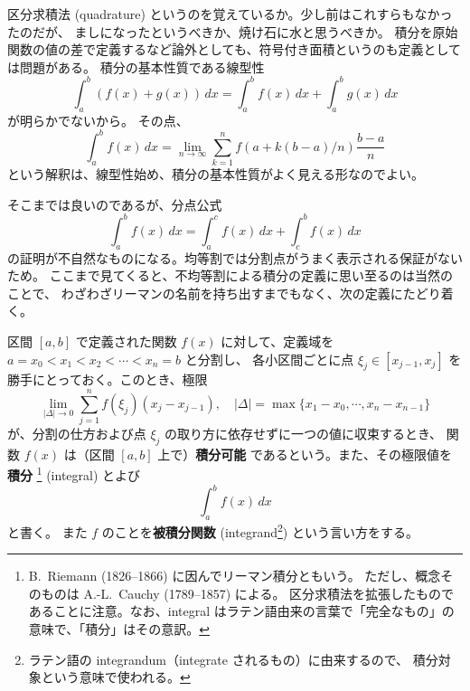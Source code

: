 \documentclass[a4paper]{jsarticle}
\theoremstyle{definition}
\theoremstyle{remark}
\begin{document}
区分求積法 (quadrature) というのを覚えているか。少し前はこれすらもなかったのだが、
ましになったというべきか、焼け石に水と思うべきか。
積分を原始関数の値の差で定義するなど論外としても、符号付き面積というのも定義としては問題がある。
積分の基本性質である線型性
\[
\int_a^b (f(x) + g(x))\, dx = \int_a^b f(x)\, dx + \int_a^b g(x)\, dx 
\]
が明らかでないから。
その点、
\[
\int_a^b f(x)\, dx = \lim_{n \to \infty} \sum_{k=1}^n f(a + k(b-a)/n) \frac{b-a}{n} 
\]
という解釈は、線型性始め、積分の基本性質がよく見える形なのでよい。

そこまでは良いのであるが、分点公式
\[
\int_a^b f(x)\, dx = \int_a^c f(x)\, dx + \int_c^b f(x)\, dx 
\]
の証明が不自然なものになる。均等割では分割点がうまく表示される保証がないため。
ここまで見てくると、不均等割による積分の定義に思い至るのは当然のことで、
わざわざリーマンの名前を持ち出すまでもなく、次の定義にたどり着く。


区間 $[a,b]$ で定義された関数 $f(x)$ に対して、定義域を
$a=x_0<x_1<x_2<\cdots<x_n=b$ と分割し、
各小区間ごとに点 $\xi_j \in [x_{j-1},x_j]$
を勝手にとっておく。このとき、極限
\[
\lim_{|\Delta| \to 0} \sum_{j=1}^n f(\xi_j)(x_j-x_{j-1}),\quad
|\Delta| = \max\{x_1-x_0,\cdots,x_n-x_{n-1}\}
\]
が、分割の仕方および点 $\xi_j$ の取り方に依存せずに一つの値に収束するとき、
関数 $f(x)$ は（区間 $[a,b]$ 上で）\textbf{積分可能} 
であるという。また、その極限値を{\bf 積分} 
\footnote{
B.~Riemann (1826--1866) に因んでリーマン積分ともいう。
ただし、概念そのものは A.-L.~Cauchy (1789--1857) による。
区分求積法を拡張したものであることに注意。なお、integral はラテン語由来の言葉で「完全なもの」の意味で、「積分」はその意訳。}
(integral) とよび
\[
\int_a^bf(x)\,dx
\]
と書く。
また $f$ のことを{\bf 被積分関数} (integrand\footnote{ラテン語の integrandum（integrate されるもの）に由来するので、
積分対象という意味で使われる。}) という言い方をする。




\begin{figure}[htbp]
  \begin{center}

\end{center}
\caption{}
\end{figure}
\end{document}
